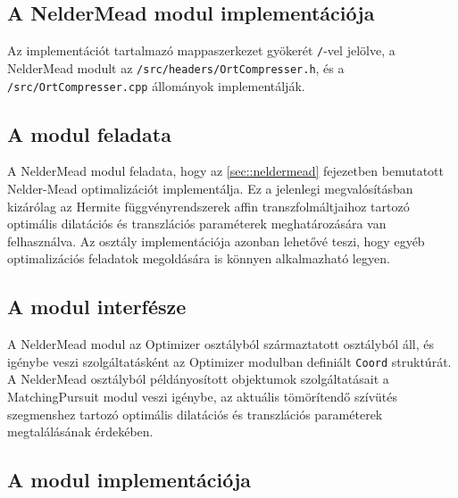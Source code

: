 \documentclass[oneside,titlepage,12pt,a4paper]{report}
\begin{document}
\subsection{A NelderMead modul implementációja} \label{subsec::nelderimp}

Az implementációt tartalmazó mappaszerkezet gyökerét \texttt{/}-vel jelölve, a NelderMead modult  az \texttt{/src/headers/OrtCompresser.h}, és a \texttt{/src/OrtCompresser.cpp} állományok implementálják.

\subsection*{A modul feladata}

\par A NelderMead modul feladata, hogy az \ref{sec::neldermead} fejezetben bemutatott Nelder-Mead optimalizációt implementálja. Ez a jelenlegi megvalósításban kizárólag az Hermite függvényrendszerek affin transzfolmáltjaihoz tartozó optimális dilatációs és transzlációs paraméterek meghatározására van felhasználva. Az osztály implementációja azonban lehetővé teszi, hogy egyéb optimalizációs feladatok megoldására is könnyen alkalmazható legyen.

\subsection*{A modul interfésze}

\par A NelderMead modul az Optimizer osztályból származtatott osztályból áll, és igénybe veszi szolgáltatásként az Optimizer modulban definiált \texttt{Coord} struktúrát. A NelderMead osztályból példányosított objektumok szolgáltatásait a MatchingPursuit modul veszi igénybe, az aktuális tömörítendő szívütés szegmenshez tartozó optimális dilatációs és transzlációs paraméterek megtalálásának érdekében.

\subsection*{A modul implementációja}
\end{document}
